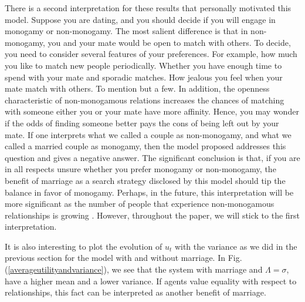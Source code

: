 \documentclass[12pt]{article}
\begin{document}
There is a second interpretation for these results that personally motivated this model. Suppose you are dating, and you should decide if you will engage in monogamy or non-monogamy. The most salient difference is that in non-monogamy, you and your mate would be open to match with others. To decide, you need to consider several features of your preferences. For example, how much you like to match new people periodically. Whether you have enough time to spend with your mate and sporadic matches. How jealous you feel when your mate match with others. To mention but a few. In addition, the openness characteristic of non-monogamous relations increases the chances of matching with someone either you or your mate have more affinity. Hence, you may wonder if the odds of finding someone better pays the cons of being left out by your mate. If one interprets what we called a couple as non-monogamy, and what we called a married couple as monogamy, then the model proposed addresses this question and gives a negative answer. The significant conclusion is that, if you are in all respects unsure whether you prefer monogamy or non-monogamy, the benefit of marriage as a search strategy disclosed by this model should tip the balance in favor of monogamy. Perhaps, in the future, this interpretation will be more significant as the number of people that experience non-monogamous relationships is growing \cite{doi:10.1080/0092623X.2016.1178675}. However, throughout the paper, we will stick to the first interpretation.

It is also interesting to plot the evolution of $u_t$ with the variance as we did in the previous section for the model with and without marriage. In Fig. (\ref{averageutilityandvariance}), we see that the system with marriage and $\Lambda=\sigma$, have a higher mean and a lower variance. If agents value equality with respect to relationships, this fact can be interpreted as another benefit of marriage. 
\end{document}
